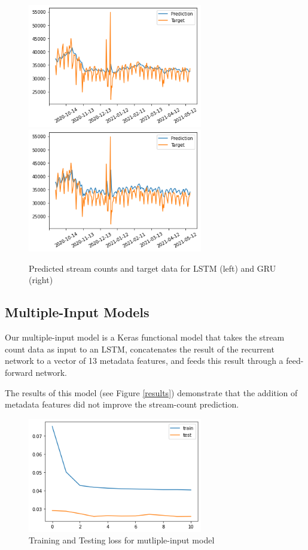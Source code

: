 \documentclass[11pt]{article}
\begin{document}
\begin{figure}[H]
    \centering
    \includegraphics[width=3in ]{figs/lstm_predicted}
    \includegraphics[width=3in]{figs/gru_predicted}
    \caption{Predicted stream counts and target data for LSTM (left) and GRU (right)}
\end{figure}

\subsection{Multiple-Input Models}

Our multiple-input model is a Keras functional model that takes the stream count data as input to an LSTM, concatenates the result of the recurrent network to a vector of 13 metadata features, and feeds this result through a feed-forward network. 

The results of this model (see Figure \ref{results}) demonstrate that the addition of metadata features did not improve the stream-count prediction. 

\begin{figure}[h]
    \centering 
    \includegraphics[width=3in]{figs/loss}
    \caption{Training and Testing loss for mutliple-input model }
\end{figure}
\end{document}
